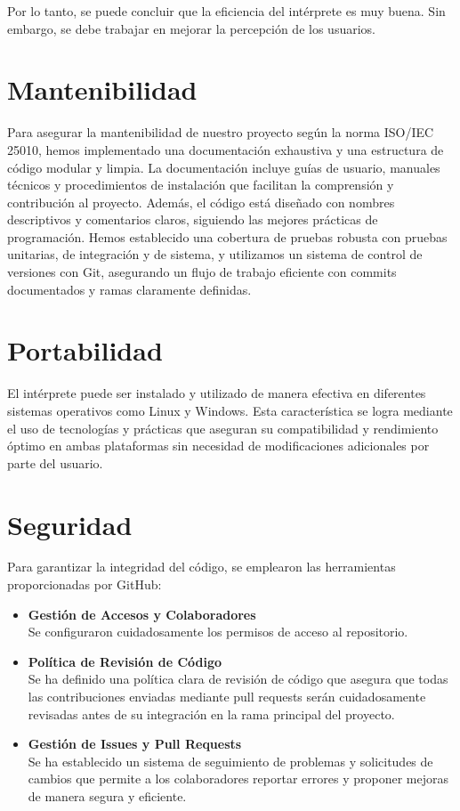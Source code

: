 Por lo tanto, se puede concluir que la eficiencia del intérprete es muy buena. Sin embargo, se debe trabajar en mejorar la percepción de los usuarios.

\section{Mantenibilidad}
Para asegurar la mantenibilidad de nuestro proyecto según la norma ISO/IEC 25010, hemos implementado una documentación exhaustiva y una estructura de código modular y limpia. La documentación incluye guías de usuario, manuales técnicos y procedimientos de instalación que facilitan la comprensión y contribución al proyecto. Además, el código está diseñado con nombres descriptivos y comentarios claros, siguiendo las mejores prácticas de programación. Hemos establecido una cobertura de pruebas robusta con pruebas unitarias, de integración y de sistema, y utilizamos un sistema de control de versiones con Git, asegurando un flujo de trabajo eficiente con commits documentados y ramas claramente definidas.

\section{Portabilidad}
El intérprete puede ser instalado y utilizado de manera efectiva en diferentes sistemas operativos como Linux y Windows. Esta característica se logra mediante el uso de tecnologías y prácticas que aseguran su compatibilidad y rendimiento óptimo en ambas plataformas sin necesidad de modificaciones adicionales por parte del usuario.

\section{Seguridad}
Para garantizar la integridad del código, se emplearon las herramientas proporcionadas por GitHub:
\begin{itemize}
  \item \textbf{Gestión de Accesos y Colaboradores} \\
  Se configuraron cuidadosamente los permisos de acceso al repositorio.
  \item \textbf{Política de Revisión de Código} \\
  Se ha definido una política clara de revisión de código que asegura que todas las contribuciones enviadas mediante pull requests serán cuidadosamente revisadas antes de su integración en la rama principal del proyecto.
  \item \textbf{Gestión de Issues y Pull Requests} \\
  Se ha establecido un sistema de seguimiento de problemas y solicitudes de cambios que permite a los colaboradores reportar errores y proponer mejoras de manera segura y eficiente.
\end{itemize}

